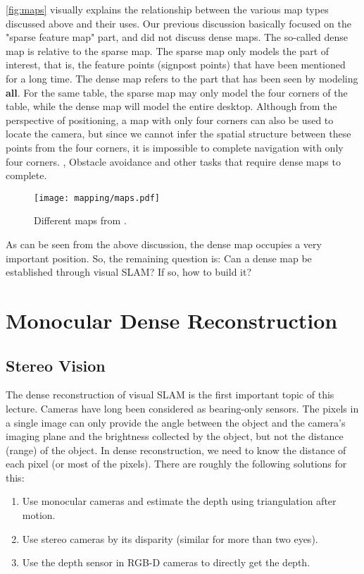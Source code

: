 \autoref{fig:maps} visually explains the relationship between the various map types discussed above and their uses. Our previous discussion basically focused on the "sparse feature map" part, and did not discuss dense maps. The so-called dense map is relative to the sparse map. The sparse map only models the part of interest, that is, the feature points (signpost points) that have been mentioned for a long time. The dense map refers to the part that has been seen by modeling \textbf{all}. For the same table, the sparse map may only model the four corners of the table, while the dense map will model the entire desktop. Although from the perspective of positioning, a map with only four corners can also be used to locate the camera, but since we cannot infer the spatial structure between these points from the four corners, it is impossible to complete navigation with only four corners. , Obstacle avoidance and other tasks that require dense maps to complete.

\begin{figure}[!ht]
	\centering
	\texttt{[image: mapping/maps.pdf]}
	\caption{Different maps from \cite{Mur-Artal2015, Labbe2014, Salas-Moreno2013}.}
	\label{fig:maps}
\end{figure}

As can be seen from the above discussion, the dense map occupies a very important position. So, the remaining question is: Can a dense map be established through visual SLAM? If so, how to build it?

\section{Monocular Dense Reconstruction}
\subsection{Stereo Vision}
The dense reconstruction of visual SLAM is the first important topic of this lecture. Cameras have long been considered as bearing-only sensors. The pixels in a single image can only provide the angle between the object and the camera's imaging plane and the brightness collected by the object, but not the distance (range) of the object. In dense reconstruction, we need to know the distance of each pixel (or most of the pixels). There are roughly the following solutions for this:
\begin{enumerate}
	\item Use monocular cameras and estimate the depth using triangulation after motion. 
	\item Use stereo cameras by its disparity (similar for more than two eyes). 
	\item Use the depth sensor in RGB-D cameras to directly get the depth. 
\end{enumerate}

